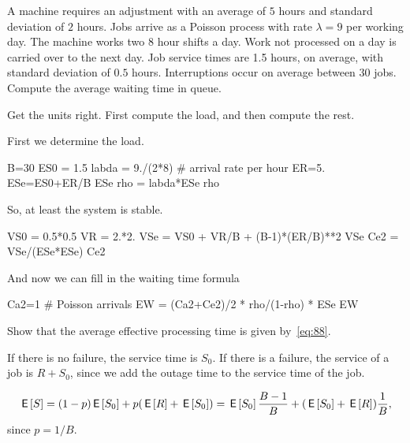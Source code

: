 \begin{exercise}
  A machine requires an adjustment with an average of $5$ hours and standard deviation of $2$ hours.
  Jobs arrive as a Poisson process with rate $\lambda=9$ per working day.
  The machine works two $8$ hour shifts a day.
  Work not processed on a day is carried over to the next day.
  Job service times are 1.5 hours, on average, with standard deviation of $0.5$ hours.
  Interruptions occur on average between $30$ jobs.
  Compute the average waiting time in queue.
\begin{hint}
  Get the units right. First compute the load, and then compute the rest.
\end{hint}
\begin{solution}
  First we determine the load. 
  \begin{pyconsole}
B=30
ES0 = 1.5
labda = 9./(2*8) # arrival rate per hour
ER=5.
ESe=ES0+ER/B
ESe
rho = labda*ESe
rho
  \end{pyconsole}
So, at least the system is stable.

\begin{pyconsole}
VS0 = 0.5*0.5
VR = 2.*2.
VSe = VS0 + VR/B + (B-1)*(ER/B)**2
VSe
Ce2 = VSe/(ESe*ESe)
Ce2
\end{pyconsole}

And now we can fill in the waiting time formula
\begin{pyconsole}
Ca2=1 # Poisson arrivals
EW = (Ca2+Ce2)/2 * rho/(1-rho) * ESe
EW  
\end{pyconsole}
\end{solution}
\end{exercise}

\begin{exercise}
Show that the average effective processing time is given by~\cref{eq:88}. 
\begin{hint}
If there is no failure, the service time is $S_0$. If there is a failure, the service of a job is $R + S_0$, since we add the outage time to the service time of the job. 
\end{hint}
\begin{solution}
    \begin{equation*}
      \,\mathsf{E}\left[S\right] = (1-p)\,\mathsf{E}\left[S_0\right] + p (\,\mathsf{E}\left[R\right] + \,\mathsf{E}\left[S_0\right]) = \,\mathsf{E}\left[S_0\right] \frac{B-1}B + (\,\mathsf{E}\left[S_0\right] + \,\mathsf{E}\left[R\right]) \frac 1B,
    \end{equation*}
since $p=1/B$. 
\end{solution}
\end{exercise}


